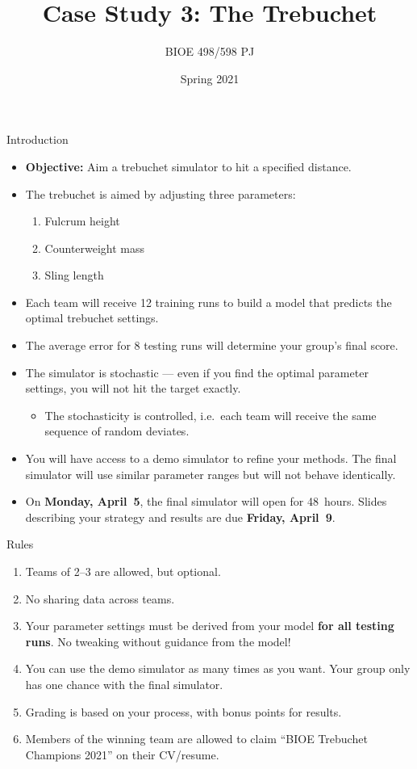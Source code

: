 \documentclass[9pt]{beamer}
\title{Case Study 3: The Trebuchet}
\author{BIOE 498/598 PJ}
\date{Spring 2021}
\begin{document}
\maketitle

\begin{frame}{Introduction}

\begin{itemize}
	\item \textbf{Objective:} Aim a trebuchet simulator to hit a specified distance.
	\item The trebuchet is aimed by adjusting three parameters:
		\begin{enumerate}
			\item Fulcrum height
			\item Counterweight mass
			\item Sling length
		\end{enumerate}
	\item Each team will receive 12 training runs to build a model that predicts the optimal trebuchet settings.
	\item The average error for 8 testing runs will determine your group's final score.
	\item The simulator is stochastic --- even if you find the optimal parameter settings, you will not hit the target exactly.
		\begin{itemize}
			\item The stochasticity is controlled, i.e.\ each team will receive the same sequence of random deviates.
		\end{itemize}
	\item You will have access to a demo simulator to refine your methods. The final simulator will use similar parameter ranges but will not behave identically.
	\item On \textbf{Monday, April~5}, the final simulator will open for 48~hours. Slides describing your strategy and results are due \textbf{Friday, April~9}.
\end{itemize}

\end{frame}

\begin{frame}{Rules}
\begin{enumerate}
	\item Teams of 2--3 are allowed, but optional.
	\item No sharing data across teams.
	\item Your parameter settings must be derived from your model \textbf{for all testing runs}. No tweaking without guidance from the model!
	\item You can use the demo simulator as many times as you want. Your group only has one chance with the final simulator.
	\item Grading is based on your process, with bonus points for results.
	\item Members of the winning team are allowed to claim ``BIOE Trebuchet Champions 2021'' on their CV/resume.
\end{enumerate}	
\end{frame}
\end{document}
